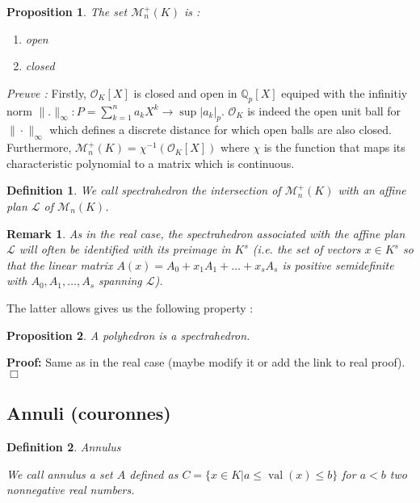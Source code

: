 \documentclass[a4paper,12pt]{article}
\newenvironment{proof}{\hbox{}\vspace{-0.5cm} {\bf Proof:}}{\hfill $\Box$ \\}
\newtheorem{proposition}{Proposition}
\newtheorem{definition}{Definition}
\newtheorem{remark}{Remark}
\DeclareMathOperator{\val}{val}
\newcommand{\OK}{\mathcal{O}_K}
\begin{document}
\begin{proposition}
	The set $\mathcal{M}_n^+\left( K \right)$ is :
	\begin{enumerate}%
		\item open
		\item closed
	\end{enumerate}
\end{proposition}

\textit{Preuve :}  
Firstly, $\OK[X]$ is closed and open in $\mathbb{Q}_{ p }[X] $ equiped with the infinitiy norm $\|.\|_\infty : P = \sum_{k=1}^{n} a_k X^k \to \sup |a_k|_p$. $\OK$ is indeed the open unit ball for $\|\cdot \|_\infty$ which defines a discrete distance for which open balls are also closed.
Furthermore, $\mathcal{M}^+_{n}\left(K \right)  = \chi^{-1}( \OK[X]) $ where $\chi$ is the function that maps its characteristic polynomial to a matrix which is continuous.

%


\begin{definition}
	We call {\it spectrahedron} the intersection of $\mathcal{M}_n^+\left( K \right) $ with an affine plan $\mathcal{L}$ of $\mathcal{M}_n\left( K \right) $.
\end{definition}

\begin{remark}
	As in the real case, the spectrahedron associated with the affine plan $\mathcal{L}$ will often be identified with its preimage in $K^s$ (i.e. the set of vectors $x \in K ^s$ so that the linear matrix $A(x) = A_0 + x_1A_1 + \ldots + x_sA_s$ is positive semidefinite with $A_0,A_1,\ldots,A_s$ spanning $\mathcal{L}$). 
\end{remark}

The latter allows gives us the following property :
\begin{proposition}
	A polyhedron is a spectrahedron.
\end{proposition}
\begin{proof}
	Same as in the real case (maybe modify it or add the link to real proof).
\end{proof}


\subsection{Annuli (couronnes)}
\begin{definition}
	Annulus
	
	We call {\it annulus} a set $A$ defined as $C = \{x \in K  | a\le \val\left(x\right) \le b\} $ for $a < b$ two nonnegative real numbers.
\end{definition}
\end{document}
